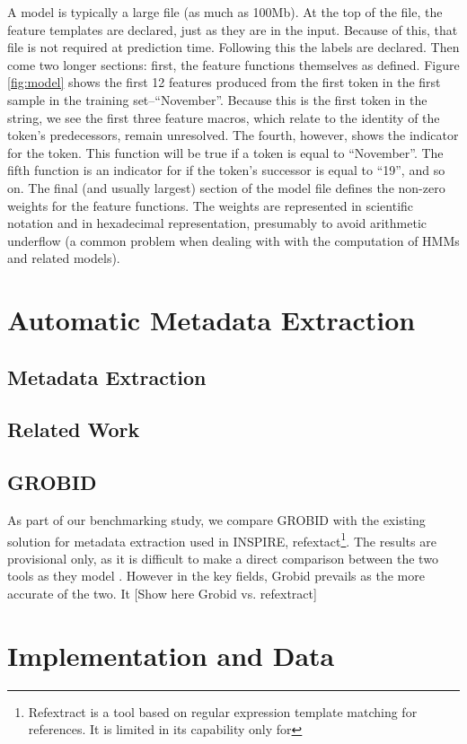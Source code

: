 \documentclass[10pt, oneside]{scrartcl}   	%
\begin{document}
A model is typically a large file (as much as 100Mb). At the top of the file, the feature templates are declared, just as they are in the input. Because of this, that file is not required at prediction time. Following this the labels are declared. Then come two longer sections: first, the feature functions themselves as defined. Figure \ref{fig:model} shows the first 12 features produced from the first token in the first sample in the training set--``November''. Because this is the first token in the string, we see the first three feature macros, which relate to the identity of the token's predecessors, remain unresolved. The fourth, however, shows the indicator for the token. This function will be true if a token is equal to ``November''. The fifth function is an indicator for if the token's successor is equal to ``19'', and so on. The final (and usually largest) section of the model file defines the non-zero weights for the feature functions. The weights are represented in scientific notation and in hexadecimal representation, presumably to avoid arithmetic underflow (a common problem when dealing with with the computation of HMMs and related models).

\section{Automatic Metadata Extraction}
\subsection{Metadata Extraction}
\subsection{Related Work}
\subsection{GROBID}
As part of our benchmarking study, we compare GROBID with the existing solution for metadata extraction used in INSPIRE, refextact\footnote{Refextract is a tool based on regular expression template matching for references. It is limited in its capability only for }. The results are provisional only, as it is difficult to make a direct comparison between the two tools as they model . However in the key fields, Grobid prevails as the more accurate of the two. It 
[Show here Grobid vs. refextract]
\section{Implementation and Data}
\end{document}
